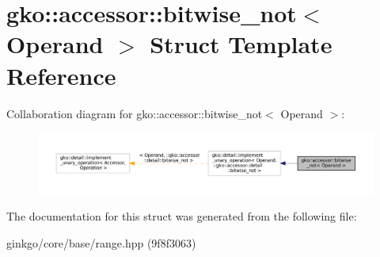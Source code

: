 \hypertarget{structgko_1_1accessor_1_1bitwise__not}{}\section{gko\+:\+:accessor\+:\+:bitwise\+\_\+not$<$ Operand $>$ Struct Template Reference}
\label{structgko_1_1accessor_1_1bitwise__not}


Collaboration diagram for gko\+:\+:accessor\+:\+:bitwise\+\_\+not$<$ Operand $>$\+:
\nopagebreak
\begin{figure}[H]
\begin{center}
\leavevmode
\includegraphics[width=350pt]{structgko_1_1accessor_1_1bitwise__not__coll__graph}
\end{center}
\end{figure}


The documentation for this struct was generated from the following file\+:\begin{DoxyCompactItemize}
\item 
ginkgo/core/base/range.\+hpp (9f8f3063)\end{DoxyCompactItemize}
